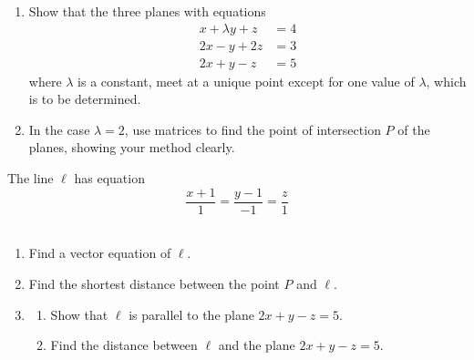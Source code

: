 \documentclass[leqno]{article}
\begin{document}
\begin{enumerate}[
  label=\textbf{\arabic*.},
  leftmargin=*,
  topsep=0pt,
  partopsep=0pt,
  parsep=0pt
]
\newpage

\questionitem

\begin{enumerate}[label=\textbf{(\alph*)}]
  \item Show that the three planes with equations
  \[
  \begin{aligned}
  x+\lambda y+z&=4 \\
  2x-y+2z&=3 \\
  2x+y-z&=5
  \end{aligned}
  \]
  where $\lambda$ is a constant, meet at a unique point except for one value of $\lambda$, which is to be determined. \\
  \item In the case $\lambda=2$, use matrices to find the point of intersection $P$ of the planes, showing your method clearly.  \\
\end{enumerate}
The line $\ell$ has equation
\[
\frac{x+1}{1}=\frac{y-1}{-1}=\frac{z}{1}
\] \\
\begin{enumerate}[label=\textbf{(\alph*)}, resume]
  \item Find a vector equation of $\ell$.  \\
  \item Find the shortest distance between the point $P$ and $\ell$.  \\
  \item
  \begin{enumerate}[label=(\roman*)]
    \item Show that $\ell$ is parallel to the plane $2x+y-z=5$. 
    \item Find the distance between $\ell$ and the plane $2x+y-z=5$.  \\
  \end{enumerate}
\end{enumerate}

\newpage

\questionitem


\end{enumerate}
\end{document}
